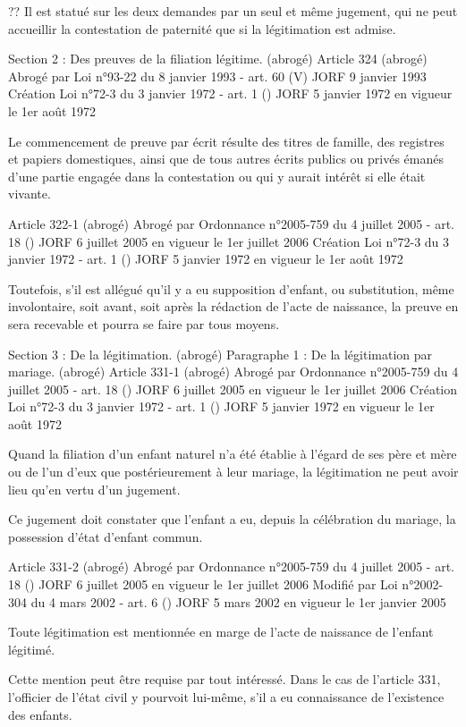 \documentclass[
  12pt,
]{book}
\begin{document}
\begin{encadre}{??}
Il est statué sur les deux demandes par un seul et même jugement, qui ne peut accueillir la contestation de paternité que si la légitimation est admise.

Section 2 : Des preuves de la filiation légitime. (abrogé)
Article 324 (abrogé)
Abrogé par Loi n°93-22 du 8 janvier 1993 - art. 60 (V) JORF 9 janvier 1993
Création Loi n°72-3 du 3 janvier 1972 - art. 1 () JORF 5 janvier 1972 en vigueur le 1er août 1972

Le commencement de preuve par écrit résulte des titres de famille, des registres et papiers domestiques, ainsi que de tous autres écrits publics ou privés émanés d'une partie engagée dans la contestation ou qui y aurait intérêt si elle était vivante.

Article 322-1 (abrogé)
Abrogé par Ordonnance n°2005-759 du 4 juillet 2005 - art. 18 () JORF 6 juillet 2005 en vigueur le 1er juillet 2006
Création Loi n°72-3 du 3 janvier 1972 - art. 1 () JORF 5 janvier 1972 en vigueur le 1er août 1972

Toutefois, s'il est allégué qu'il y a eu supposition d'enfant, ou substitution, même involontaire, soit avant, soit après la rédaction de l'acte de naissance, la preuve en sera recevable et pourra se faire par tous moyens.

Section 3 : De la légitimation. (abrogé)
Paragraphe 1 : De la légitimation par mariage. (abrogé)
Article 331-1 (abrogé)
Abrogé par Ordonnance n°2005-759 du 4 juillet 2005 - art. 18 () JORF 6 juillet 2005 en vigueur le 1er juillet 2006
Création Loi n°72-3 du 3 janvier 1972 - art. 1 () JORF 5 janvier 1972 en vigueur le 1er août 1972

Quand la filiation d'un enfant naturel n'a été établie à l'égard de ses père et mère ou de l'un d'eux que postérieurement à leur mariage, la légitimation ne peut avoir lieu qu'en vertu d'un jugement.

Ce jugement doit constater que l'enfant a eu, depuis la célébration du mariage, la possession d'état d'enfant commun.

Article 331-2 (abrogé)
Abrogé par Ordonnance n°2005-759 du 4 juillet 2005 - art. 18 () JORF 6 juillet 2005 en vigueur le 1er juillet 2006
Modifié par Loi n°2002-304 du 4 mars 2002 - art. 6 () JORF 5 mars 2002 en vigueur le 1er janvier 2005

Toute légitimation est mentionnée en marge de l'acte de naissance de l'enfant légitimé.

Cette mention peut être requise par tout intéressé. Dans le cas de l'article 331, l'officier de l'état civil y pourvoit lui-même, s'il a eu connaissance de l'existence des enfants.


\end{encadre}
\end{document}
